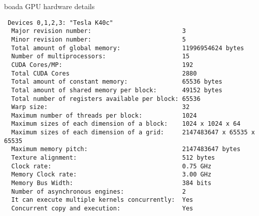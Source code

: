 \begin{listing}[H]
    \caption{boada GPU hardware details}%
    \label{lst:gpu_info_boada}
 \begin{verbatim}
 Devices 0,1,2,3: "Tesla K40c"
  Major revision number:                         3
  Minor revision number:                         5
  Total amount of global memory:                 11996954624 bytes
  Number of multiprocessors:                     15
  CUDA Cores/MP:                                 192
  Total CUDA Cores                               2880
  Total amount of constant memory:               65536 bytes
  Total amount of shared memory per block:       49152 bytes
  Total number of registers available per block: 65536
  Warp size:                                     32
  Maximum number of threads per block:           1024
  Maximum sizes of each dimension of a block:    1024 x 1024 x 64
  Maximum sizes of each dimension of a grid:     2147483647 x 65535 x 65535
  Maximum memory pitch:                          2147483647 bytes
  Texture alignment:                             512 bytes
  Clock rate:                                    0.75 GHz
  Memory Clock rate:                             3.00 GHz
  Memory Bus Width:                              384 bits
  Number of asynchronous engines:                2
  It can execute multiple kernels concurrently:  Yes
  Concurrent copy and execution:                 Yes
 \end{verbatim}
\end{listing}
